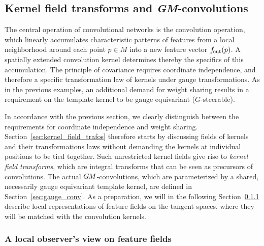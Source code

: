 

\subsection{Kernel field transforms and \textit{GM}-convolutions}
\label{sec:gauge_conv_main}


The central operation of convolutional networks is the convolution operation, which linearly accumulates characteristic patterns of features from a local neighborhood around each point $p\in M$ into a new feature vector $f_\textup{\:\!\!out}(p)$.
A spatially extended convolution kernel determines thereby the specifics of this accumulation.
The principle of covariance requires coordinate independence, and therefore a specific transformation law of kernels under gauge transformations.
As in the previous examples, an additional demand for weight sharing results in a requirement on the template kernel to be gauge equivariant ($G$-steerable).

In accordance with the previous section, we clearly distinguish between the requirements for coordinate independence and weight sharing.
Section~\ref{sec:kernel_field_trafos} therefore starts by discussing fields of kernels and their transformations laws without demanding the kernels at individual positions to be tied together.
Such unrestricted kernel fields give rise to \emph{kernel field transforms}, which are integral transforms that can be seen as precursors of convolutions.
The actual $G\mkern-1.4muM$-convolutions, which are parameterized by a shared, necessarily gauge equivariant template kernel, are defined in Section~\ref{sec:gauge_conv}.
As a preparation, we will in the following Section~\ref{sec:observers_view} describe local representations of feature fields on the tangent spaces, where they will be matched with the convolution kernels.







\subsubsection{A local observer's view on feature fields}
\label{sec:observers_view}

